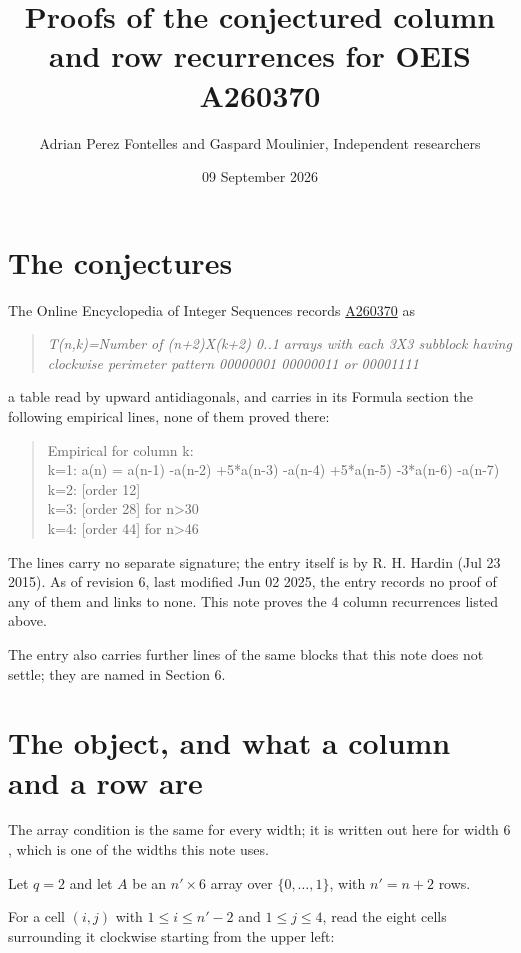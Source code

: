 \documentclass[11pt]{article}
\title{Proofs of the conjectured column and row recurrences for OEIS A260370}
\author{Adrian Perez Fontelles and Gaspard Moulinier, Independent researchers}
\date{09 September 2026}
\theoremstyle{definition}
\begin{document}
\maketitle
\section{The conjectures}

The Online Encyclopedia of Integer Sequences records \href{https://oeis.org/A260370}{A260370} as

\begin{quote}\itshape T(n,k)=Number of (n+2)X(k+2) 0..1 arrays with each 3X3 subblock having clockwise perimeter pattern 00000001 00000011 or 00001111\end{quote}

a table read by upward antidiagonals, and carries in its Formula section the following empirical lines, none of them proved there:

\begin{quote}\ttfamily Empirical for column k:\\
k=1: a(n) = a(n-1) -a(n-2) +5*a(n-3) -a(n-4) +5*a(n-5) -3*a(n-6) -a(n-7)\\k=2: [order 12]\\k=3: [order 28] for n>30\\k=4: [order 44] for n>46\end{quote}

The lines carry no separate signature; the entry itself is by R. H. Hardin (Jul 23 2015). As of revision 6, last modified Jun 02 2025, the entry records no proof of any of them and links to none. This note proves the 4 column recurrences listed above.

The entry also carries further lines of the same blocks that this note does not settle; they are named in Section 6.

\section{The object, and what a column and a row are}

The array condition is the same for every width; it is written out here for width $6$, which is one of the widths this note uses.

Let $q = 2$ and let $A$ be an $n' \times 6$ array over $\{0,\dots,1\}$, with $n' = n + 2$ rows.

For a cell $(i,j)$ with $1 \le i \le n'-2$ and $1 \le j \le 4$, read the eight cells surrounding it clockwise starting from the upper left:
\end{document}
